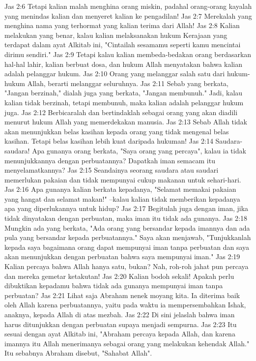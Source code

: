 Jas 2:6  Tetapi kalian malah menghina orang miskin, padahal orang-orang kayalah yang menindas kalian dan menyeret kalian ke pengadilan!
Jas 2:7  Merekalah yang menghina nama yang terhormat yang kalian terima dari Allah!
Jas 2:8  Kalian melakukan yang benar, kalau kalian melaksanakan hukum Kerajaan yang terdapat dalam ayat Alkitab ini, "Cintailah sesamamu seperti kamu mencintai dirimu sendiri."
Jas 2:9  Tetapi kalau kalian membeda-bedakan orang berdasarkan hal-hal lahir, kalian berbuat dosa, dan hukum Allah menyatakan bahwa kalian adalah pelanggar hukum.
Jas 2:10  Orang yang melanggar salah satu dari hukum-hukum Allah, berarti melanggar seluruhnya.
Jas 2:11  Sebab yang berkata, "Jangan berzinah," dialah juga yang berkata, "Jangan membunuh." Jadi, kalau kalian tidak berzinah, tetapi membunuh, maka kalian adalah pelanggar hukum juga.
Jas 2:12  Berbicaralah dan bertindaklah sebagai orang yang akan diadili menurut hukum Allah yang memerdekakan manusia.
Jas 2:13  Sebab Allah tidak akan menunjukkan belas kasihan kepada orang yang tidak mengenal belas kasihan. Tetapi belas kasihan lebih kuat daripada hukuman!
Jas 2:14  Saudara-saudara! Apa gunanya orang berkata, "Saya orang yang percaya", kalau ia tidak menunjukkannya dengan perbuatannya? Dapatkah iman semacam itu menyelamatkannya?
Jas 2:15  Seandainya seorang saudara atau saudari memerlukan pakaian dan tidak mempunyai cukup makanan untuk sehari-hari.
Jas 2:16  Apa gunanya kalian berkata kepadanya, "Selamat memakai pakaian yang hangat dan selamat makan!" --kalau kalian tidak memberikan kepadanya apa yang diperlukannya untuk hidup?
Jas 2:17  Begitulah juga dengan iman, jika tidak dinyatakan dengan perbuatan, maka iman itu tidak ada gunanya.
Jas 2:18  Mungkin ada yang berkata, "Ada orang yang bersandar kepada imannya dan ada pula yang bersandar kepada perbuatannya." Saya akan menjawab, "Tunjukkanlah kepada saya bagaimana orang dapat mempunyai iman tanpa perbuatan dan saya akan menunjukkan dengan perbuatan bahwa saya mempunyai iman."
Jas 2:19  Kalian percaya bahwa Allah hanya satu, bukan? Nah, roh-roh jahat pun percaya dan mereka gemetar ketakutan!
Jas 2:20  Kalian bodoh sekali! Apakah perlu dibuktikan kepadamu bahwa tidak ada gunanya mempunyai iman tanpa perbuatan?
Jas 2:21  Lihat saja Abraham nenek moyang kita. Ia diterima baik oleh Allah karena perbuatannya, yaitu pada waktu ia mempersembahkan Ishak, anaknya, kepada Allah di atas mezbah.
Jas 2:22  Di sini jelaslah bahwa iman harus ditunjukkan dengan perbuatan supaya menjadi sempurna.
Jas 2:23  Itu sesuai dengan ayat Alkitab ini, "Abraham percaya kepada Allah, dan karena imannya itu Allah menerimanya sebagai orang yang melakukan kehendak Allah." Itu sebabnya Abraham disebut, "Sahabat Allah".
